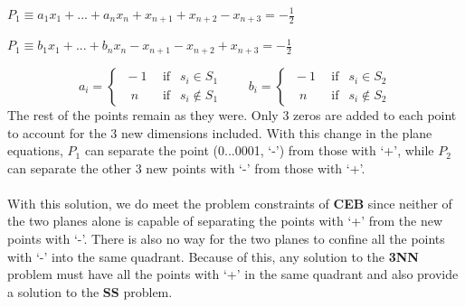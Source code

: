 \documentclass[../main]{subfiles}
\begin{document}
\begin{center}
    $P_1 \equiv a_1x_1 + ... + a_nx_n + x_{n+1} + x_{n+2} - x_{n+3} = - \frac{1}{2}$
    
    $P_1 \equiv b_1x_1 + ... + b_nx_n-x_{n+1}-x_{n+2}+x_{n+3} = - \frac{1}{2}$
\end{center}
\begin{equation*}
    a_i = \begin{cases}
  \ -1 \ \ & \text{if } \  \ s_i \in S_1 \\
  \ \ \ n & \text{if }  \ \ s_i \notin S_1
\end{cases}
\quad \quad b_i = \begin{cases}
  \ -1 \ \ & \text{if } \  \ s_i \in S_2 \\
  \ \ \ n & \text{if }  \ \ s_i \notin S_2
\end{cases}
\end{equation*}
The rest of the points remain as they were. Only 3 zeros are added to each point to account for the 3 new dimensions included. With this change in the plane equations, $P_1$ can separate the point (0...0001, `-') from those with `+', while $P_2$ can separate the other 3 new points with `-' from those with `+'.\\\\
With this solution, we do meet the problem constraints of \textbf{CEB} since neither of the two planes alone is capable of separating the points with `+' from the new points with `-'. There is also no way for the two planes to confine all the points with `-' into the same quadrant. Because of this, any solution to the \textbf{3NN} problem must have all the points with `+' in the same quadrant and also provide a solution to the \textbf{SS} problem.
\end{document}
